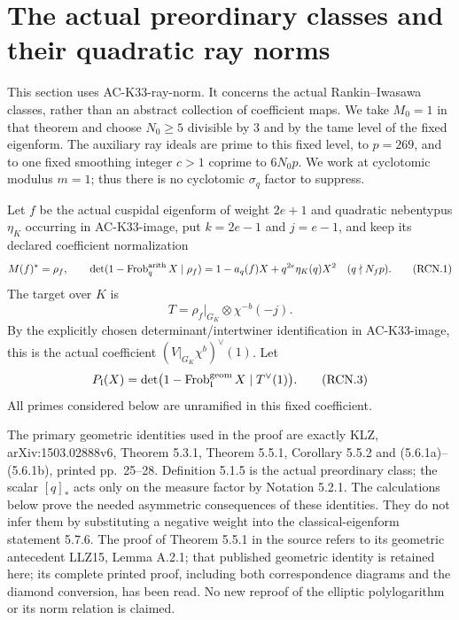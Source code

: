 \section{The actual preordinary classes and their quadratic ray norms}
\label{sec:preordinary-ray-classes}

This section uses AC-K33-ray-norm.  It concerns the actual
Rankin--Iwasawa classes, rather than an abstract collection of
coefficient maps.  We take \(M_0=1\) in that theorem and choose
\(N_0\geq5\) divisible by \(3\) and by the tame level of the
fixed eigenform.  The auxiliary ray ideals are prime to this
fixed level, to \(p=269\), and to one fixed smoothing integer
\(c>1\) coprime to \(6N_0p\).  We work at cyclotomic modulus \(m=1\); thus there is
no cyclotomic \(\sigma_q\) factor to suppress.

Let \(f\) be the actual cuspidal eigenform of weight \(2e+1\)
and quadratic nebentypus \(\eta_K\) occurring in AC-K33-image,
put \(k=2e-1\) and \(j=e-1\), and keep its declared coefficient
normalization
\[
 M(f)^*=\rho_f,\qquad
 \det(1-\operatorname{Frob}_q^{\rm arith}X\mid\rho_f)
       =1-a_q(f)X+q^{2e}\eta_K(q)X^2
 \quad(q\nmid N_fp).
 \tag{RCN.1}
\]
The target over \(K\) is
\[
 T=\rho_f|_{G_K}\otimes\chi^{-b}(-j).
 \tag{RCN.2}
\]
By the explicitly chosen determinant/intertwiner identification
in AC-K33-image, this is the actual coefficient
\((V|_{G_K}\chi^b)^\vee(1)\).  Let
\[
 P_{\mathfrak l}(X)
   =\det\bigl(1-
       \operatorname{Frob}_{\mathfrak l}^{\rm geom}X
                    \mid T^\vee(1)\bigr).
 \tag{RCN.3}
\]
All primes considered below are unramified in this fixed
coefficient.

The primary geometric identities used in the proof are exactly
KLZ, arXiv:1503.02888v6, Theorem 5.3.1, Theorem 5.5.1,
Corollary 5.5.2 and (5.6.1a)--(5.6.1b), printed pp.~25--28.
Definition 5.1.5 is the actual preordinary class; the scalar
\([q]_*\) acts only on the measure factor by Notation 5.2.1.
The calculations below prove the needed asymmetric consequences
of these identities.  They do not infer them by substituting a
negative weight into the classical-eigenform statement 5.7.6.
The proof of Theorem 5.5.1 in the source refers to its geometric
antecedent LLZ15, Lemma A.2.1; that published geometric identity
is retained here; its complete printed proof, including both
correspondence diagrams and the diamond conversion, has been read.
No new reproof of the elliptic polylogarithm or its norm relation
is claimed.

